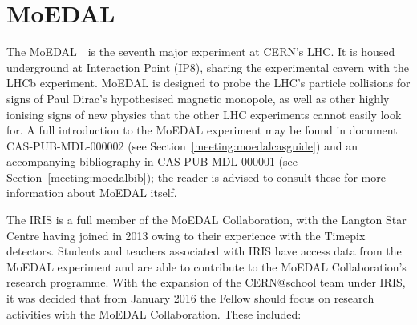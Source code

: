 \section{MoEDAL}
\label{sec:moedal}
The \acl{MoEDAL}~\cite{MoEDAL2009}\
is the seventh major experiment at \acs{CERN}'s \acf{LHC}.
It is housed underground at Interaction Point (IP8), sharing
the experimental cavern with the \acs{LHCb} experiment.
%
\acs{MoEDAL} is designed to probe the \acs{LHC}'s particle collisions
for signs of Paul Dirac's hypothesised magnetic monopole,
as well as other highly ionising signs of new physics that
the other \acs{LHC} experiments cannot easily look for.
%
A full introduction to the \acs{MoEDAL} experiment may be found
in document CAS-PUB-MDL-000002 (see Section~\ref{meeting:moedalcasguide})
and an accompanying bibliography in CAS-PUB-MDL-000001
(see Section~\ref{meeting:moedalbib}); the reader is advised to
consult these for more information about \ac{MoEDAL} itself.
%

The \acf{IRIS} is a full member of 
the \acs{MoEDAL} Collaboration, with the Langton Star Centre having
joined in 2013 owing to their experience with the Timepix detectors.
Students and teachers associated with \acs{IRIS}
have access data from the \acs{MoEDAL} experiment and are able to
contribute to the \acs{MoEDAL} Collaboration's research programme.
%
With the expansion of the CERN@school team under \acs{IRIS},
it was decided that from January 2016
the Fellow should focus on research activities
with the \acs{MoEDAL} Collaboration. These included:

